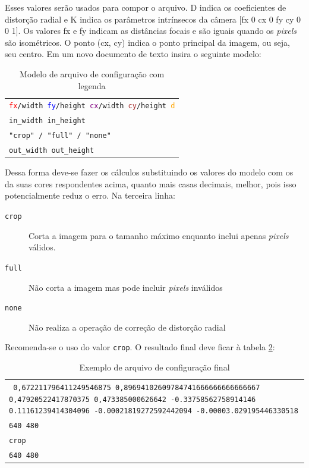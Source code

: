 Esses valores serão usados para compor o arquivo. D indica os coeficientes de distorção radial e K indica os parâmetros intrínsecos da câmera [fx 0 cx 0 fy cy 0 0 1]. Os valores fx e fy indicam as distâncias focais e são iguais quando os \textit{pixels} são isométricos. O ponto (cx, cy) indica o ponto principal da imagem, ou seja, seu centro. Em um novo documento de texto insira o seguinte modelo:

\begin{table}[H]\label{tb:7}
\begin{tabular}{| p{\textwidth}|}
\hline
\texttt{\textcolor{red}{fx}/\textcolor{OliveGreen}{width} \textcolor{blue}{fy}/\textcolor{WildStrawberry}{height} \textcolor{purple}{cx}/\textcolor{OliveGreen}{width} \textcolor{brown}{cy}/\textcolor{WildStrawberry}{height} \textcolor{orange}{d}}\\
\texttt{\textcolor{OliveGreen}{in\_width} \textcolor{WildStrawberry}{in\_height}}\\
\texttt{"crop" / "full" / "none"}\\
\texttt{\textcolor{OliveGreen}{out\_width} \textcolor{WildStrawberry}{out\_height}}\\
\hline
\end{tabular}
\caption{Modelo de arquivo de configuração com legenda}
\end{table}

Dessa forma deve-se fazer os cálculos substituindo os valores do modelo com os da suas cores respondentes acima, quanto mais casas decimais, melhor, pois isso potencialmente reduz o erro. Na terceira linha:

\begin{description}
\item[\texttt{crop}]{Corta a imagem para o tamanho máximo enquanto inclui apenas \textit{pixels} válidos.}
\item[\texttt{full}]{Não corta a imagem mas pode incluir \textit{pixels} inválidos}
\item[\texttt{none}]{Não realiza a operação de correção de distorção radial}
\end{description}

Recomenda-se o uso do valor \texttt{crop}. O resultado final deve ficar à tabela \ref{tb:8}:

\begin{table}[H]\label{tb:8}
\begin{tabular}{| p{\textwidth}|}
\hline
\texttt{
0,672211796411249546875 0,89694102609784741666666666666667 0,47920522417870375 0,473385000626642 -0.33758562758914146 0.11161239414304096 -0.00021819272592442094 -0.00003.029195446330518}\\
\texttt{640 480}\\
\texttt{crop}\\
\texttt{640 480}\\
\hline
\end{tabular}
\caption{Exemplo de arquivo de configuração final}
\end{table}

